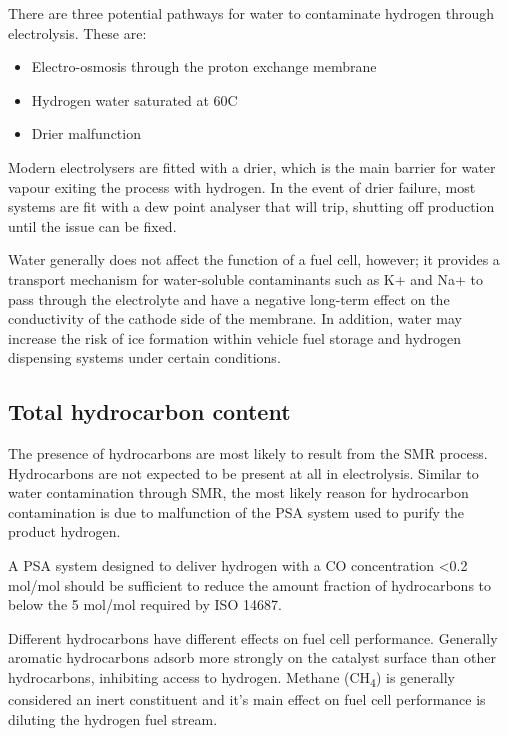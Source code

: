 There are three potential pathways for water to contaminate hydrogen through electrolysis. These are:
\begin{itemize}
    \item Electro-osmosis through the proton exchange membrane
    \item Hydrogen water saturated at 60\textdegree C
    \item Drier malfunction
\end{itemize}
Modern electrolysers are fitted with a drier, which is the main barrier for water vapour exiting the process with hydrogen. \cite{Bacquart2018} In the event of drier failure, most systems are fit with a dew point analyser that will trip, shutting off production until the issue can be fixed. \cite{Bacquart2018}

Water generally does not affect the function of a fuel cell, however; it provides a transport mechanism for water-soluble contaminants such as K+ and Na+ \cite{InternationalStandardISO14687-2:20122012} to pass through the electrolyte and have a negative long-term effect on the conductivity of the cathode side of the membrane. In addition, water may increase the risk of ice formation within vehicle fuel storage and hydrogen dispensing systems under certain conditions. 

\subsection*{Total hydrocarbon content}
The presence of hydrocarbons are most likely to result from the SMR process. Hydrocarbons are not expected to be present at all in electrolysis. Similar to water contamination through SMR, the most likely reason for hydrocarbon contamination is due to malfunction of the PSA system used to purify the product hydrogen. 

A PSA system designed to deliver hydrogen with a CO concentration <0.2 \textmu mol/mol should be sufficient to reduce the amount fraction of hydrocarbons to below the 5 \textmu mol/mol required by ISO 14687. \cite{Bacquart2018}

Different hydrocarbons have different effects on fuel cell performance. Generally aromatic hydrocarbons adsorb more strongly on the catalyst surface than other hydrocarbons, inhibiting access to hydrogen.\cite{InternationalStandardISO14687-2:20122012} Methane (CH\textsubscript{4}) is generally considered an inert constituent and it's main effect on fuel cell performance is  diluting the hydrogen fuel stream. \cite{InternationalStandardISO14687-2:20122012}


